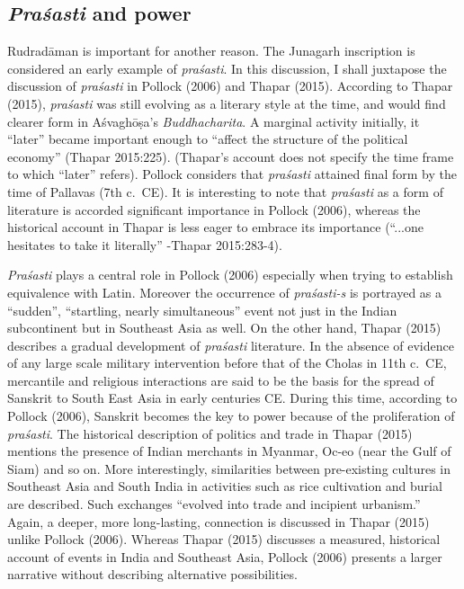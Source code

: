 \subsection{{\sl Praśasti} and power}

Rudradāman is important for another reason. The Junagarh inscription is considered an early example of {\sl praśasti}. In this discussion, I shall juxtapose the discussion of {\sl praśasti} in Pollock (2006) and Thapar (2015). According to Thapar (2015), {\sl praśasti} was still evolving as a literary style at the time, and would find clearer form in Aśvaghōṣa’s {\sl Buddhacharita}. A marginal activity initially, it “later” became important enough to “affect the structure of the political economy” (Thapar 2015:225). (Thapar’s account does not specify the time frame to which “later” refers). Pollock considers that {\sl praśasti} attained final form by the time of Pallavas (7th c.\ CE). It is interesting to note that {\sl praśasti} as a form of literature is accorded significant importance in Pollock (2006), whereas the historical account in Thapar is less eager to embrace its importance (“...one hesitates to take it literally” -Thapar 2015:283-4).

{\sl Praśasti} plays a central role in Pollock (2006) especially when trying to establish equivalence with Latin. Moreover the occurrence of {\sl praśasti-s} is portrayed as a “sudden”, “startling, nearly simultaneous” event not just in the Indian subcontinent but in Southeast Asia as well. On the other hand, Thapar (2015) describes a gradual development of {\sl praśasti} literature. In the absence of evidence of any large scale military intervention before that of the Cholas in 11th c.\ CE, mercantile and religious interactions are said to be the basis for the spread of Sanskrit to South East Asia in early centuries CE. During this time, according to Pollock (2006), Sanskrit becomes the key to power because of the proliferation of {\sl praśasti}. The historical description of politics and trade in Thapar (2015) mentions the presence of Indian merchants in Myanmar, Oc-eo (near the Gulf of Siam) and so on. More interestingly, similarities between pre-existing cultures in Southeast Asia and South India in activities such as rice cultivation and burial are described. Such exchanges “evolved into trade and incipient urbanism.” Again, a deeper, more long-lasting, connection is discussed in Thapar (2015) unlike Pollock (2006). Whereas Thapar (2015) discusses a measured, historical account of events in India and Southeast Asia, Pollock (2006) presents a larger narrative without describing alternative possibilities.

